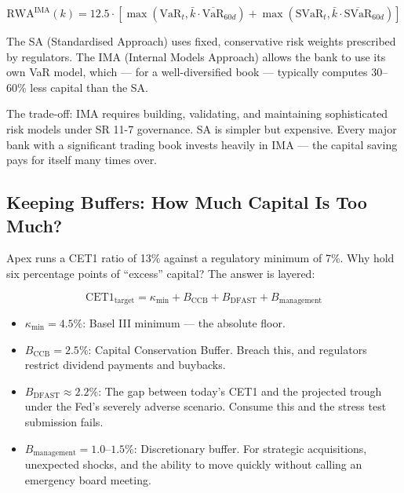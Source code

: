 \documentclass[12pt,a4paper]{article}
\begin{document}
\begin{equation}
  \text{RWA}^{\text{IMA}}(k) = 12.5 \cdot \left[ \max\left(\text{VaR}_t,
    \bar{k} \cdot \overline{\text{VaR}}_{60d}\right)
    + \max\left(\text{SVaR}_t, \bar{k} \cdot \overline{\text{SVaR}}_{60d}\right) \right]
\end{equation}

The SA (Standardised Approach) uses fixed, conservative risk weights prescribed
by regulators.  The IMA (Internal Models Approach) allows the bank to use its
own VaR model, which --- for a well-diversified book --- typically computes
30--60\% less capital than the SA.

The trade-off: IMA requires building, validating, and maintaining sophisticated
risk models under SR 11-7 governance.  SA is simpler but expensive.  Every
major bank with a significant trading book invests heavily in IMA --- the
capital saving pays for itself many times over.

\subsection{Keeping Buffers: How Much Capital Is Too Much?}

Apex runs a CET1 ratio of 13\% against a regulatory minimum of 7\%.  Why hold
six percentage points of ``excess'' capital?  The answer is layered:

\begin{equation}
  \text{CET1}_{\text{target}} = \kappa_{\text{min}} + B_{\text{CCB}} + B_{\text{DFAST}} + B_{\text{management}}
\end{equation}

\begin{itemize}[noitemsep]
  \item $\kappa_{\text{min}} = 4.5\%$: Basel III minimum --- the absolute floor.
  \item $B_{\text{CCB}} = 2.5\%$: Capital Conservation Buffer.  Breach this,
        and regulators restrict dividend payments and buybacks.
  \item $B_{\text{DFAST}} \approx 2.2\%$: The gap between today's CET1 and
        the projected trough under the Fed's severely adverse scenario.
        Consume this and the stress test submission fails.
  \item $B_{\text{management}} = 1.0\text{--}1.5\%$: Discretionary buffer.
        For strategic acquisitions, unexpected shocks, and the ability to move
        quickly without calling an emergency board meeting.
\end{itemize}
\end{document}
